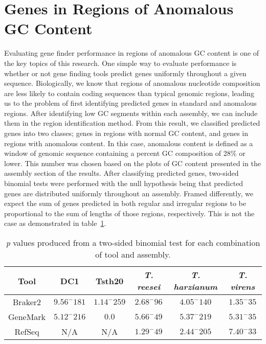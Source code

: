 \section{Genes in Regions of Anomalous GC Content}

Evaluating gene finder performance in regions of anomalous GC content
is one of the key topics of this research. One simple way to evaluate
performance is whether or not gene finding tools predict genes
uniformly throughout a given sequence. Biologically, we know that
regions of anomalous nucleotide composition are less likely to contain
coding sequences than typical genomic regions, leading us to the
problem of first identifying predicted genes in standard and anomalous
regions. After identifying low GC segments within each assembly, we
can include them in the region identification method. From this
result, we classified predicted genes into two classes; genes in
regions with normal GC content, and genes in regions with anomalous
content. In this case, anomalous content is defined as a window of
genomic sequence containing a percent GC composition of 28\% or
lower. This number was chosen based on the plots of GC content
presented in the assembly section of the results. After classifying
predicted genes, two-sided binomial tests were performed with the null
hypothesis being that predicted genes are distributed uniformly
throughout an assembly. Framed differently, we expect the sum of genes
predicted in both regular and irregular regions to be proportional to
the sum of lengths of those regions, respectively. This is not the
case as demonstrated in table~\ref{table:gc-binomial}.

\begin{table}
  \begin{center}
    \begin{tabular}{|c|c|c|c|c|c|}
      \hline
      Tool & DC1 & Tsth20 & \textit{T. reesei} & \textit{T. harzianum} & \textit{T. virens} \\ \hline
      Braker2 & $9.56^-181$ & $1.14^-259$ & $2.68^-96$ & $4.05^-140$ & $1.35^-35$ \\ \hline
      GeneMark & $5.12^-216$ & $0.0$ & $5.66^-49$ & $5.37^-219$ & $5.31^-35$ \\ \hline
      RefSeq & N/A & N/A & $1.29^-49$ & $2.44^-205$ & $7.40^-33$ \\ \hline
    \end{tabular}
  \end{center}
  \caption{\textit{p} values produced from a two-sided binomial test
    for each combination of tool and assembly.}
  \label{table:gc-binomial}
\end{table}
